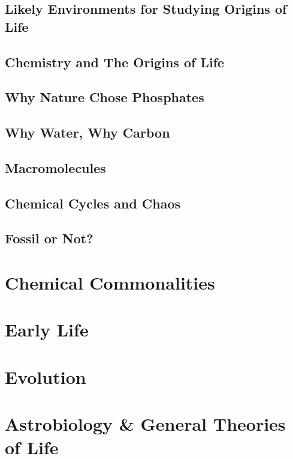 \documentclass[]{article}
\begin{document}
\subsection{Likely Environments for Studying Origins of Life}
\subsection{Chemistry and The Origins of Life}
\subsection{Why Nature Chose Phosphates}
\subsection{Why Water, Why Carbon}
\subsection{Macromolecules}
\subsection{Chemical Cycles and Chaos}
\subsection{Fossil or Not?}
\section{Chemical Commonalities}
\section{Early Life}
\section{Evolution}
\section{Astrobiology \& General Theories of Life}



\end{document}
